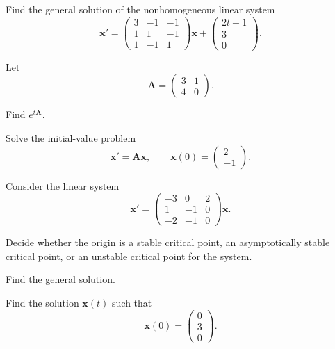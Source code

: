 \documentclass[11pt,oneside]{article}
\begin{document}
\begin{problem}
Find the general solution of the nonhomogeneous linear system
\[
\mathbf x'=
\begin{pmatrix}
3&-1&-1\\
1&1&-1\\
1&-1&1
\end{pmatrix}\mathbf x
+
\begin{pmatrix}
2t+1\\
3\\
0
\end{pmatrix}.
\]
\end{problem}

\begin{problem}
Let
\[
\mathbf A=
\begin{pmatrix}
3&1\\
4&0
\end{pmatrix}.
\]
\begin{problemsubparts}
\item Find $e^{t\mathbf A}$.
\item Solve the initial-value problem
\[
\mathbf x'=\mathbf A\mathbf x,
\qquad
\mathbf x(0)=
\begin{pmatrix}
2\\
-1
\end{pmatrix}.
\]
\end{problemsubparts}
\end{problem}

\begin{problem}
Consider the linear system
\[
\mathbf x'=
\begin{pmatrix}
-3&0&2\\
1&-1&0\\
-2&-1&0
\end{pmatrix}\mathbf x.
\]
\begin{problemsubparts}
\item Decide whether the origin is a stable critical point, an asymptotically stable critical point, or an unstable critical point for the system.
\item Find the general solution.
\item Find the solution $\mathbf x(t)$ such that
\[
\mathbf x(0)=
\begin{pmatrix}
0\\3\\0
\end{pmatrix}.
\]
\end{problemsubparts}
\end{problem}
\end{document}
